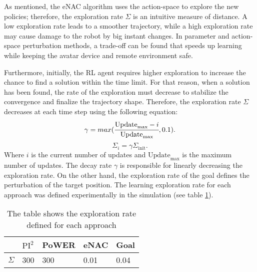 \documentclass[letterpaper, 10 pt, conference]{ieeeconf}  %
\begin{document}
\noindent
As mentioned, the eNAC algorithm uses the action-space to explore the new policies; therefore, the exploration rate $\Sigma$ is an intuitive measure of distance. A low exploration rate leads to a smoother trajectory, while a high exploration rate may cause damage to the robot by big instant changes. In parameter and action-space perturbation methods, a trade-off can be found that speeds up learning while keeping the avatar device and remote environment safe.  

\noindent
Furthermore, initially, the RL agent requires higher exploration to increase the chance to find a solution within the time limit. For that reason, when a solution has been found, the rate of the exploration must decrease to stabilize the convergence and finalize the trajectory shape. Therefore, the exploration rate $\Sigma$ decreases at each time step using the following equation:
\begin{equation}
\gamma = max(\cfrac{\textrm{Update}_{\textrm{max}} - i}{\textrm{Update}_{\textrm{max}}}, 0.1).
\end{equation}
\begin{equation}
\Sigma_i = \gamma \Sigma_{\textrm{init}}.
\end{equation}
Where $i$ is the current number of updates and $\textrm{Update}_{\textrm{max}}$ is the maximum number of updates. The decay rate $\gamma$ is responsible for linearly decreasing the exploration rate.
On the other hand, the exploration rate of the goal defines the perturbation of the target position.
The learning exploration rate for each approach was defined experimentally in the simulation (see table \ref{tab:exploration_rate}).
\begin{table}[b]
    \caption{The table shows the exploration rate defined for each approach}
    \label{tab:exploration_rate}
    \centering
        \begin{tabular}{|l|l|l|l|l|}
            \hline
               & $\textrm{PI}^2$ & PoWER & eNAC & Goal\\ \hline
            $\Sigma$ & 300 & 300 & 0.01 & 0.04\\ \hline
        \end{tabular}
\end{table}
\end{document}
